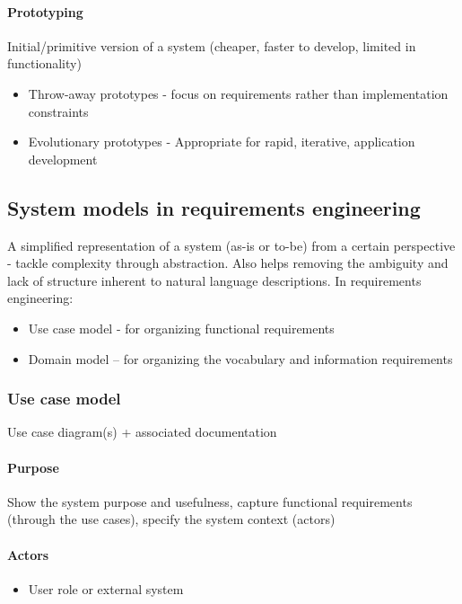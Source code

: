 \documentclass[../ESOF_notes.tex]{subfiles}
\begin{document}
\paragraph{Prototyping}

Initial/primitive version of a system (cheaper, faster to develop, limited in functionality)
\begin{itemize}
    \item Throw-away prototypes - focus on requirements rather than implementation constraints
    \item Evolutionary prototypes - Appropriate for rapid, iterative, application development
\end{itemize}


\subsection{System models in requirements engineering}

A simplified representation of a system (as-is or to-be) from a certain perspective - tackle complexity through abstraction. 
Also helps removing the ambiguity and lack of structure inherent to natural language descriptions.
In requirements engineering:
\begin{itemize}
    \item Use case model - for organizing functional requirements
    \item Domain model – for organizing the vocabulary and information requirements
\end{itemize}


\subsubsection{Use case model}

Use case diagram(s) + associated documentation

\paragraph{Purpose} 

Show the system purpose and usefulness, capture functional requirements (through the use cases), specify the system context (actors)

\paragraph{Actors}
\begin{itemize}
    \item User role or external system
\end{itemize}
\end{document}
